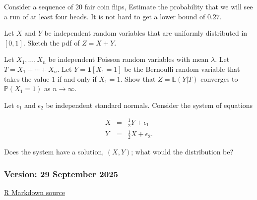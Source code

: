 \documentclass[
]{article}
\begin{document}
\begin{exercise}
Consider a sequence of $20$ fair coin flips, Estimate the probability that we will see a run of at least four heads.   It is not hard to get a lower bound of $0.27$.
    \end{exercise}

\begin{exercise}
Let $X$ and $Y$ be independent random variables that are uniformly distributed in $[0,1]$.  Sketch the pdf of $Z = X+Y$.  
    
\end{exercise}

\begin{exercise}
Let $X_1, \ldots, X_n$ be independent Poisson random variables with mean $\lambda$.   Let $T = X_1 + \cdots + X_n$.  Let $Y = \mathbf{1}[X_1=1]$ be the Bernoulli random variable that takes the value $1$ if and only if $X_1=1$.     Show that  $Z=\mathbb{E}(Y |T)$ converges to $\mathbb{P}(X_1=1)$ as $n \to \infty$.
    
\end{exercise}

\begin{exercise}
Let $\epsilon_1$ and $\epsilon_2$ be independent standard normals. Consider the system of equations

\begin{eqnarray*}
 X &=& \tfrac{1}{2} Y + \epsilon_1 \\
 Y &=& \tfrac{1}{2} X + \epsilon_2.    
\end{eqnarray*}

Does the system have a solution, $(X,Y)$; what would the distribution be?
    
\end{exercise}

\subsubsection{Version: 29 September
2025}\label{version-29-september-2025}

\href{https://tsoo-math.github.io/ucl2/hello-R-2025.Rmd}{R Markdown
source}
\end{document}

